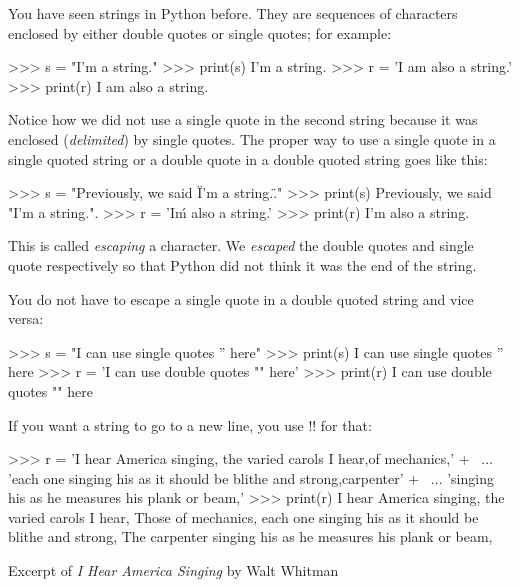 \documentclass[11pt]{cselabheader}
\begin{document}
You have seen strings in Python before. They are sequences of characters
enclosed by either double quotes or single quotes; for example:

\begin{pyconcode}
>>> s = "I'm a string."
>>> print(s)
I'm a string.
>>> r = 'I am also a string.'
>>> print(r)
I am also a string.
\end{pyconcode}

Notice how we did not use a single quote in the second string because it was
enclosed (\emph{delimited}) by single quotes. The proper way to use a single
quote in a single quoted string or a double quote in a double quoted string
goes like this:

\begin{pyconcode}
>>> s = "Previously, we said \"I'm a string.\"."
>>> print(s)
Previously, we said "I'm a string.".
>>> r = 'I\'m also a string.'
>>> print(r)
I'm also a string.
\end{pyconcode}

This is called \emph{escaping} a character. We \emph{escaped} the double quotes
and single quote respectively so that Python did not think it was the end of
the string.

You do not have to escape a single quote in a double quoted string and vice
versa:

\begin{pyconcode}
>>> s = "I can use single quotes '' here"
>>> print(s)
I can use single quotes '' here
>>> r = 'I can use double quotes "" here'
>>> print(r)
I can use double quotes "" here
\end{pyconcode}

If you want a string to go to a new line, you use \pythoninline!\n! for that:

\begin{listing}[H]
  \vspace{-0.5em}
\begin{pyconcode}
>>> r = 'I hear America singing, the varied carols I hear,\nThose of mechanics,' + \
...     'each one singing his as it should be blithe and strong,\nThe carpenter' + \
...     'singing his as he measures his plank or beam,'
>>> print(r)
I hear America singing, the varied carols I hear,
Those of mechanics, each one singing his as it should be blithe and strong,
The carpenter singing his as he measures his plank or beam,
\end{pyconcode}
  \vspace{-1em}
  \caption{Excerpt of \emph{I Hear America Singing} by Walt Whitman}
  \vspace{-0.5em}
\end{listing}
\end{document}
